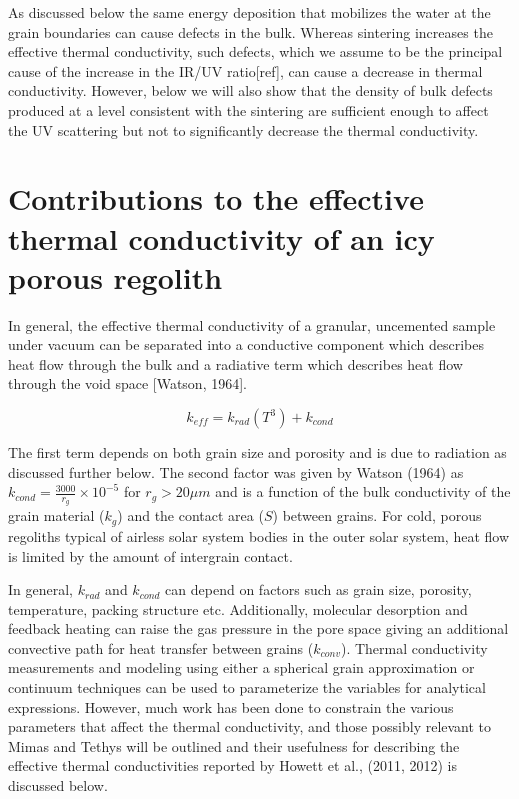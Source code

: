 \documentclass[11pt]{article} %
\begin{document}
	 As discussed below the same energy deposition that mobilizes the water at the grain boundaries can cause defects in the bulk. Whereas sintering increases the effective thermal conductivity, such defects, which we assume to be the principal cause of the increase in the IR/UV ratio[ref], can cause a decrease in thermal conductivity. However, below we will also show that the density of bulk defects produced at a level consistent with the sintering are sufficient enough to affect the UV scattering but not to significantly decrease the thermal conductivity.
	
	
\section{Contributions to the effective thermal conductivity of an icy porous regolith}

	In general, the effective thermal conductivity of a granular, uncemented sample under vacuum can be separated into a conductive component which describes heat flow through the bulk and a radiative term which describes heat flow through the void space [Watson, 1964]. 
	
	\begin{equation} \label{eq:TCbasic}
	k_{eff} = k_{rad}(T^{3}) + k_{cond}
	\end{equation} 
	
	The first term depends on both grain size and porosity and is due to radiation as discussed further below. The second factor was given by Watson (1964) as $k_{cond} = \frac{3000}{r_{g}}\times10^{-5}$ for $r_{g} > 20 \mu m$ and is a function of the bulk conductivity of the grain material ($k_{g}$) and the contact area ($S$) between grains. For cold, porous regoliths typical of airless solar system bodies in the outer solar system, heat flow is limited by the amount of intergrain contact.

	In general, $k_{rad}$ and $k_{cond}$ can depend on factors such as grain size, porosity, temperature, packing structure etc. Additionally, molecular desorption and feedback heating can raise the gas pressure in the pore space giving an additional convective path for heat transfer between grains ($k_{conv}$). Thermal conductivity measurements and modeling using either a spherical grain approximation or continuum techniques can be used to parameterize the variables for analytical expressions. However, much work has been done to constrain the various parameters that affect the thermal conductivity, and those possibly relevant to Mimas and Tethys will be outlined and their usefulness for describing the effective thermal conductivities reported by Howett et al., (2011, 2012) is discussed below.
	
\end{document}
